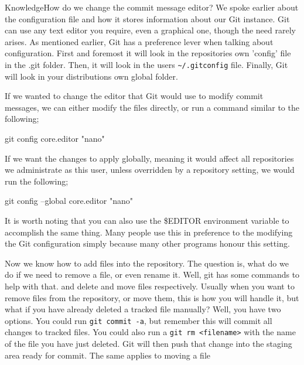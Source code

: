 \begin{callout}{Knowledge}{How do we change the commit message editor?}
We spoke earlier about the configuration file and how it stores information about our Git instance.
Git can use any text editor you require, even a graphical one, though the need rarely arises.
As mentioned earlier, Git has a preference lever when talking about configuration.
First and foremost it will look in the repositories own 'config' file in the .git folder.
Then, it will look in the users \texttt{\textasciitilde/.gitconfig} file.
Finally, Git will look in your distributions own global folder.

If we wanted to change the editor that Git would use to modify commit messages, we can either modify the files directly, or run a command similar to the following;

\begin{code}
git config core.editor "nano"
\end{code}

If we want the changes to apply globally, meaning it would affect all repositories we administrate as this user, unless overridden by a repository setting, we would run the following;

\begin{code}
git config --global core.editor "nano"
\end{code}

It is worth noting that you can also use the \$EDITOR environment variable to accomplish the same thing.
Many people use this in preference to the modifying the Git configuration simply because many other programs honour this setting.
\end{callout}

Now we know how to add files into the repository.
The question is, what do we do if we need to remove a file, or even rename it.
Well, git has some commands to help with that.
 and  delete and move files respectively.
Usually when you want to remove files from the repository, or move them, this is how you will handle it, but what if you have already deleted a tracked file manually? Well, you have two options.
You could run \texttt{git commit -a}, but remember this will commit all changes to tracked files.
You could also run a \texttt{git rm <filename>} with the name of the file you have just deleted.
Git will then push that change into the staging area ready for commit.
The same applies to moving a file


